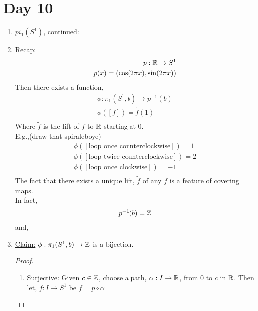 \section{Day 10}
    \begin{enumerate}
        \item \underline{$pi_1(S^1)$, continued:}
        \item \underline{Recap:}
            \begin{align*}
                p: \mathbb{R} \rightarrow S^{1}\\
                p(x)=(\cos(2\pi x), \sin(2\pi x))\\
            \end{align*}
            Then there exists a function,
            \begin{align*}
                \phi : \pi_1(S^{1}, b)\rightarrow p^{-1}(b)\\
                \phi([f])=\tilde{f}(1)\\
            \end{align*}
            Where $\tilde{f}$ is the lift of $f$ to $\mathbb{R}$ starting at $0$.\\
            E.g.,(draw that spiraleboye)
            \begin{align*}
                \phi([\text{loop once counterclockwise}])=1\\
                \phi([\text{loop twice counterclockwise}])=2\\
                \phi([\text{loop once clockwise}])=-1\\
            \end{align*}
            The fact that there exists a unique lift, $\tilde{f}$ of any $f$ is a feature
            of covering maps.\\
            In fact,
            \begin{align*}
                p^{-1}(b)=\mathbb{Z}\\
            \end{align*}
            and,\\
        \item \underline{Claim:} $\phi: \pi_1(S^1, b)\rightarrow \mathbb{Z}$ is a bijection.
            \begin{proof}
                \begin{enumerate}
                    \item \underline{Surjective:} Given $c\in\mathbb{Z}$, choose a path, $\alpha: I \rightarrow \mathbb{R}$, from
                        $0$ to $c$ in $\mathbb{R}$. Then let, $f: I \rightarrow S^1$ be $f=p\circ \alpha$\\

\end{enumerate}
\end{proof}
\end{enumerate}
